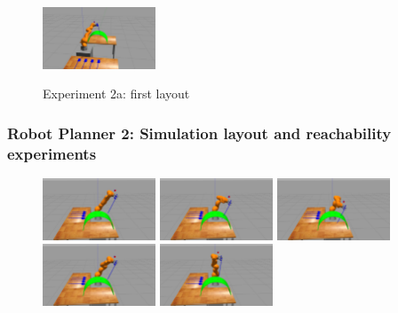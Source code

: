 \begin{frame}
\begin{center}
\begin{figure}[!htb]
\includegraphics[width=0.3\textwidth]{../images/robot_planner2/robot_planner2_8}\\
\caption{Experiment 2a: first layout}
\label{experiment-robot-planner2a}
\end{figure}
\end{center}
\end{frame}


\begin{frame}
\frametitle{Robot Planner 2: Simulation layout and reachability experiments}
\begin{center}
\begin{figure}[!htb]
\centering
\includegraphics[width=0.3\textwidth]{../images/robot_planner2b/robot_planner2b_1}
\includegraphics[width=0.3\textwidth]{../images/robot_planner2b/robot_planner2b_2}
\includegraphics[width=0.3\textwidth]{../images/robot_planner2b/robot_planner2b_3}\\
\includegraphics[width=0.3\textwidth]{../images/robot_planner2b/robot_planner2b_4}
\includegraphics[width=0.3\textwidth]{../images/robot_planner2b/robot_planner2b_5}

\end{figure}
\end{center}
\end{frame}
